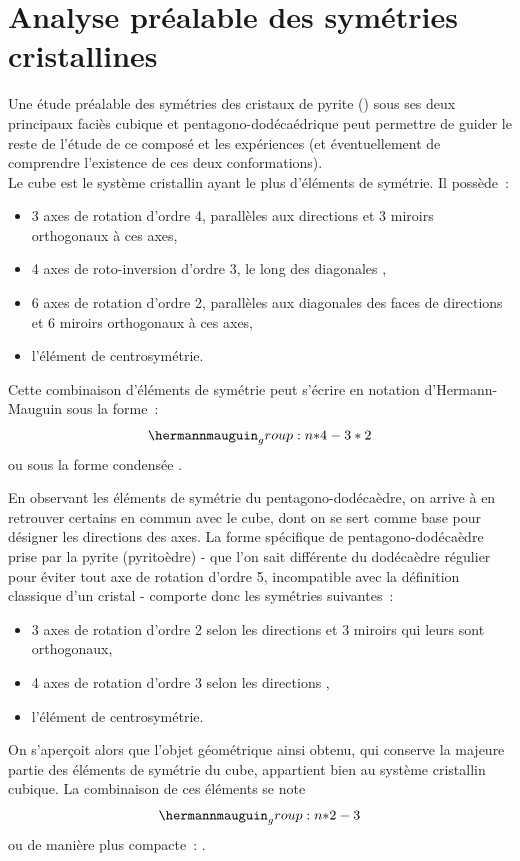 \section{Analyse préalable des symétries cristallines}

Une étude préalable des symétries des cristaux de pyrite () sous ses deux principaux faciès cubique et pentagono-dodécaédrique peut permettre de guider le reste de l'étude de ce composé et les expériences (et éventuellement de comprendre l'existence de ces deux conformations).\\
Le cube est le système cristallin ayant le plus d'éléments de symétrie. Il possède~:
\begin{itemize}
    \item 3 axes de rotation d'ordre 4, parallèles aux directions  et 3 miroirs orthogonaux à ces axes,
    \item 4 axes de roto-inversion d'ordre 3, le long des diagonales ,
    \item 6 axes de rotation d'ordre 2, parallèles aux diagonales des faces de directions  et 6 miroirs orthogonaux à ces axes,
    \item l'élément de centrosymétrie.
\end{itemize}
Cette combinaison d'éléments de symétrie peut s'écrire en notation d'Hermann-Mauguin sous la forme~:
\[
\hmn{*4 -3 *2}
\]
ou sous la forme condensée .

En observant les éléments de symétrie du pentagono-dodécaèdre, on arrive à en retrouver certains en commun avec le cube, dont on se sert comme base pour désigner les directions des axes. La forme spécifique de pentagono-dodécaèdre prise par la pyrite (pyritoèdre) - que l'on sait différente du dodécaèdre régulier pour éviter tout axe de rotation d'ordre 5, incompatible avec la définition classique d'un cristal - comporte donc les symétries suivantes~:
\begin{itemize}
    \item 3 axes de rotation d'ordre 2 selon les directions  et 3 miroirs qui leurs sont orthogonaux,
    \item 4 axes de rotation d'ordre 3 selon les directions ,
    \item l'élément de centrosymétrie.
\end{itemize}
On s'aperçoit alors que l'objet géométrique ainsi obtenu, qui conserve la majeure partie des éléments de symétrie du cube, appartient bien au système cristallin cubique.
La combinaison de ces éléments se note 
\[
\hmn{*2 -3}
\]
ou de manière plus compacte~: .

